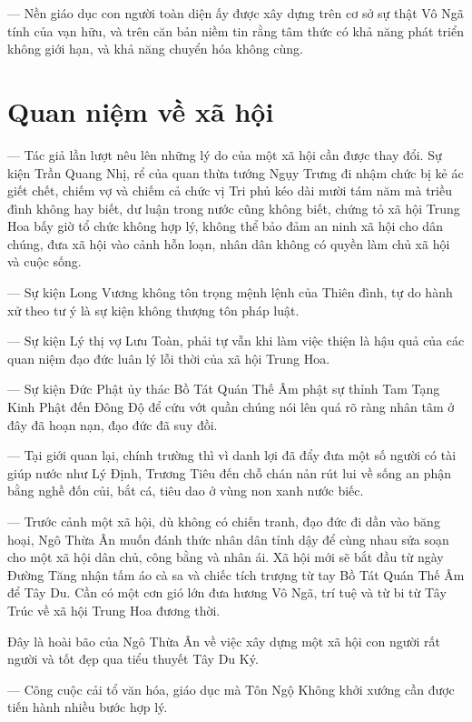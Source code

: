 — Nền giáo dục con người toàn diện ấy được xây dựng trên cơ sở sự thật Vô Ngã tính của vạn hữu, và trên căn bản niềm tin rằng tâm thức có khả năng phát triển không giới hạn, và khả năng chuyển hóa không cùng.


\section{Quan niệm về xã hội} %
\label{sec:9_xa_hoi}

— Tác giả lần lượt nêu lên những lý do của một xã hội cần được thay đổi. Sự kiện Trần Quang Nhị, rể của quan thừa tướng Ngụy Trưng đi nhậm chức bị kẻ ác giết chết, chiếm vợ và chiếm cả chức vị Tri phủ kéo dài mười tám năm mà triều đình không hay biết, dư luận trong nước cũng không biết, chứng tỏ xã hội Trung Hoa bấy giờ tổ chức không hợp lý, không thể bảo đảm an ninh xã hội cho dân chúng, đưa xã hội vào cảnh hỗn loạn, nhân dân không có quyền làm chủ xã hội và cuộc sống.

— Sự kiện Long Vương không tôn trọng mệnh lệnh của Thiên đình, tự do hành xử theo tư ý là sự kiện không thượng tôn pháp luật.

— Sự kiện Lý thị vợ Lưu Toàn, phải tự vẫn khi làm việc thiện là hậu quả của các quan niệm đạo đức luân lý lỗi thời của xã hội Trung Hoa.

— Sự kiện Đức Phật ủy thác Bồ Tát Quán Thế Âm phật sự thỉnh Tam Tạng Kinh Phật đến Đông Độ để cứu vớt quần chúng nói lên quá rõ ràng nhân tâm ở đây đã hoạn nạn, đạo đức đã suy đồi.

— Tại giới quan lại, chính trường thì vì danh lợi đã đẩy đưa một số người có tài giúp nước như Lý Định, Trương Tiêu đến chỗ chán nản rút lui về sống an phận bằng nghề đốn củi, bắt cá, tiêu dao ở vùng non xanh nước biếc.

— Trước cảnh một xã hội, dù không có chiến tranh, đạo đức đi dần vào băng hoại, Ngô Thừa Ân muốn đánh thức nhân dân tỉnh dậy để cùng nhau sửa soạn cho một xã hội dân chủ, công bằng và nhân ái. Xã hội mới sẽ bắt đầu từ ngày Đường Tăng nhận tấm áo cà sa và chiếc tích trượng từ tay Bồ Tát Quán Thế Âm để Tây Du. Cần có một cơn gió lớn đưa hương Vô Ngã, trí tuệ và từ bi từ Tây Trúc về xã hội Trung Hoa đương thời.

Đây là hoài bão của Ngô Thừa Ân về việc xây dựng một xã hội con người rất người và tốt đẹp qua tiểu thuyết Tây Du Ký.

— Công cuộc cải tổ văn hóa, giáo dục mà Tôn Ngộ Không khởi xướng cần được tiến hành nhiều bước hợp lý.

